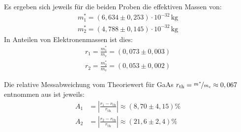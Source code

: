         Es ergeben sich jeweils für die beiden Proben die effektiven Massen von:
        \begin{align*}
            m^*_1 = (6,634 \pm 0,253) \cdot 10^{-32} \, \text{kg} \\[5pt]
            m^*_2 = (4,788 \pm 0,145) \cdot 10^{-32} \, \text{kg}
        \end{align*}
        In Anteilen von Elektronenmassen ist dies:
        \begin{align*}
            r_1 = \frac{m^*_1}{m_{\text{e}}} = (0,073 \pm 0,003) \\[7pt]
            r_2 = \frac{m^*_2}{m_{\text{e}}} = (0,053 \pm 0,002)
        \end{align*}

        Die relative Messabweichung vom Theoriewert für GaAs $r_{\text{th}} = \nicefrac{m^*}{m_{\text{e}}} \approx 0,067$ entnommen aus \cite{ciddor_refractive_1996} ist jeweils:
        \begin{align*}
            A_1 &= \left|\frac{r_1 - r_{\text{th}}}{r_{\text{th}}}\right| \approx (8,70 \pm 4,15) \% \\[7pt]
            A_2 &= \left|\frac{r_2 - r_{\text{th}}}{r_{\text{th}}}\right| \approx (21,6 \pm 2,4) \%
        \end{align*}


















































